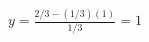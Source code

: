 \documentclass[preview]{standalone}
\begin{document}
\begin{align*}
y = \frac{2/3 - (1/3)(1)}{1/3} = 1
\end{align*}
\end{document}
